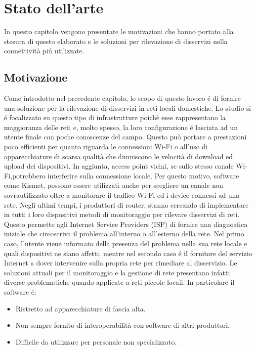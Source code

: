 \chapter{Stato dell'arte}
In questo capitolo vengono presentate le motivazioni che hanno portato alla stesura di questo elaborato e le soluzioni per rilevazione di disservizi nella connettivit\`a pi\'u utilizzate.

\section{Motivazione}
Come introdotto nel precedente capitolo, lo scopo di questo lavoro \'e di fornire una soluzione per la rilevazione di disservizi in reti locali domestiche.
Lo studio si \'e focalizzato su questo tipo di infrastrutture poich\`e esse rappresentano la maggioranza delle reti e, molto spesso, la loro configurazione \'e  lasciata ad un utente finale con poche conoscenze del campo.
Questo pu\`o portare a prestazioni poco efficienti per quanto riguarda le connessioni Wi-Fi o all'uso di apparecchiature di scarsa qualit\`a che dimuiscono le velocit\`a di download ed upload dei dispositivi.
In aggiunta, access point vicini, se sullo stesso canale Wi-Fi,potrebbero interferire sulla connessione locale.
Per questo motivo, software come Kismet\cite{kismet}, possono essere utilizzati anche per scegliere un canale non sovrautilizzato oltre a monitorare il traffico Wi-Fi ed i device connessi ad una rete.
Negli ultimi tempi, i produttori di router, stanno cercando di implementare in tutti i loro dispositivi metodi di monitoraggio per rilevare disservizi di reti.
Questo permette agli Internet Service Providers (ISP) di fornire una diagnostica iniziale che circoscriva il problema all'interno o all'esterno della rete.
Nel primo caso, l'utente viene informato della presenza del problema nella sua rete locale e quali dispositivi ne siano affetti, mentre nel secondo caso \'e il fornitore del servizio Internet a dover intervenire sulla propria rete per rimediare al disservizio.
Le soluzioni attuali per il monitoraggio e la gestione di rete presentano infatti diverse problematiche quando applicate a reti piccole locali.
\newpage
In particolare il software \'e:
\begin{itemize}
	\item Ristretto ad apparecchiature di fascia alta.
	\item Non sempre fornito di interoperabilit\`a con software di altri produttori.
	\item Difficile da utilizzare per personale non specializzato.
\end{itemize}

